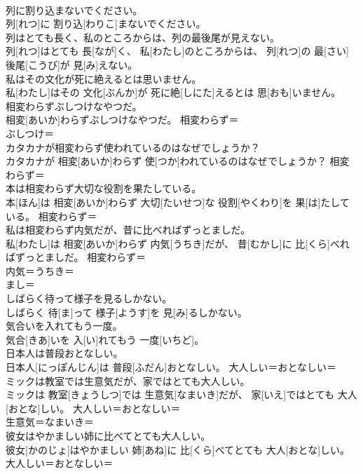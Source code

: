 \documentclass[8pt]{extreport}
\begin{document}
\begin{CJK}{UTF8}{min}
\\	列に割り込まないでください。	
\\	列[れつ]に 割り込[わりこ]まないでください。	
\\	列はとても長く、私のところからは、列の最後尾が見えない。	
\\	列[れつ]はとても 長[なが]く、 私[わたし]のところからは、 列[れつ]の 最[さい] 後尾[こうび]が 見[み]えない。	
\\	私はその文化が死に絶えるとは思いません。	
\\	私[わたし]はその 文化[ぶんか]が 死に絶[しにた]えるとは 思[おも]いません。	
\\	相変わらずぶしつけなやつだ。	
\\	相変[あいか]わらずぶしつけなやつだ。	相変わらず＝ 
\\	ぶしつけ＝ 
\\	カタカナが相変わらず使われているのはなぜでしょうか？	
\\	カタカナが 相変[あいか]わらず 使[つか]われているのはなぜでしょうか？	相変わらず＝ 
\\	本は相変わらず大切な役割を果たしている。	
\\	本[ほん]は 相変[あいか]わらず 大切[たいせつ]な 役割[やくわり]を 果[は]たしている。	相変わらず＝ 
\\	私は相変わらず内気だが、昔に比べればずっとましだ。	
\\	私[わたし]は 相変[あいか]わらず 内気[うちき]だが、 昔[むかし]に 比[くら]べればずっとましだ。	相変わらず＝ 
\\	内気＝うちき＝ 
\\	まし＝ 
\\	しばらく待って様子を見るしかない。	
\\	しばらく 待[ま]って 様子[ようす]を 見[み]るしかない。	
\\	気合いを入れてもう一度。	
\\	気合[きあ]いを 入[い]れてもう 一度[いちど]。	
\\	日本人は普段おとなしい。	
\\	日本人[にっぽんじん]は 普段[ふだん]おとなしい。	大人しい＝おとなしい＝ 
\\	ミックは教室では生意気だが、家ではとても大人しい。	
\\	ミックは 教室[きょうしつ]では 生意気[なまいき]だが、 家[いえ]ではとても 大人[おとな]しい。	大人しい＝おとなしい＝ 
\\	生意気＝なまいき＝ 
\\	彼女はやかましい姉に比べてとても大人しい。	
\\	彼女[かのじょ]はやかましい 姉[あね]に 比[くら]べてとても 大人[おとな]しい。	大人しい＝おとなしい＝ 

\end{CJK}
\end{document}
